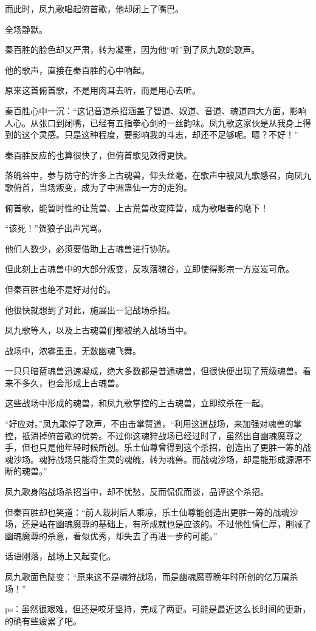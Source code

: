 \begin{this_body}
而此时，凤九歌唱起俯首歌，他却闭上了嘴巴。

全场静默。

秦百胜的脸色却又严肃，转为凝重，因为他“听”到了凤九歌的歌声。

他的歌声，直接在秦百胜的心中响起。

原来这首俯首歌，不是用肉耳去听，而是用心去听。

秦百胜心中一沉：“这记音道杀招涵盖了智道、奴道、音道、魂道四大方面，影响人心。从张口到闭嘴，已经有五指拳心剑的一丝韵味。凤九歌这家伙是从我身上得到的这个灵感。只是这种程度，要影响我的斗志，却还不足够呢。嗯？不好！”

秦百胜反应的也算很快了，但俯首歌见效得更快。

落魄谷中，参与防守的许多上古魂兽，仰头丝毫，在歌声中被凤九歌感召，向凤九歌俯首，当场叛变，成为了中洲蛊仙一方的走狗。

俯首歌，能暂时性的让荒兽、上古荒兽改变阵营，成为歌唱者的麾下！

“该死！”贺狼子出声咒骂。

他们人数少，必须要借助上古魂兽进行协防。

但此刻上古魂兽中的大部分叛变，反攻落魄谷，立即使得影宗一方岌岌可危。

但秦百胜也绝不是好对付的。

他很快就想到了对此，施展出一记战场杀招。

凤九歌等人，以及上古魂兽们都被纳入战场当中。

战场中，浓雾重重，无数幽魂飞舞。

一只只暗蓝魂兽迅速凝成，绝大多数都是普通魂兽，但很快便出现了荒级魂兽。看来不多久，也会形成上古魂兽。

这些战场中形成的魂兽，和凤九歌掌控的上古魂兽，立即绞杀在一起。

“好应对。”凤九歌停了歌声，不由击掌赞道，“利用这道战场，来加强对魂兽的掌控，抵消掉俯首歌的优势。不过你这魂狩战场已经过时了，虽然出自幽魂魔尊之手，但也只是他年轻时候所创。乐土仙尊曾得到这个杀招，创造出了更胜一筹的战魂沙场。魂狩战场只能将生灵的魂魄，转为魂兽。而战魂沙场，却是能形成源源不断的魂兽。”

凤九歌身陷战场杀招当中，却不忧愁，反而侃侃而谈，品评这个杀招。

但秦百胜却也笑道：“前人栽树后人乘凉，乐土仙尊能创造出更胜一筹的战魂沙场，还是站在幽魂魔尊的基础上，有所成就也是应该的。不过他性情仁厚，削减了幽魂魔尊的杀意，看似优秀，却失去了再进一步的可能。”

话语刚落，战场上又起变化。

凤九歌面色陡变：“原来这不是魂狩战场，而是幽魂魔尊晚年时所创的亿万屠杀场！”

ps：虽然很艰难，但还是咬牙坚持，完成了两更。可能是最近这么长时间的更新，的确有些疲累了吧。

\end{this_body}

